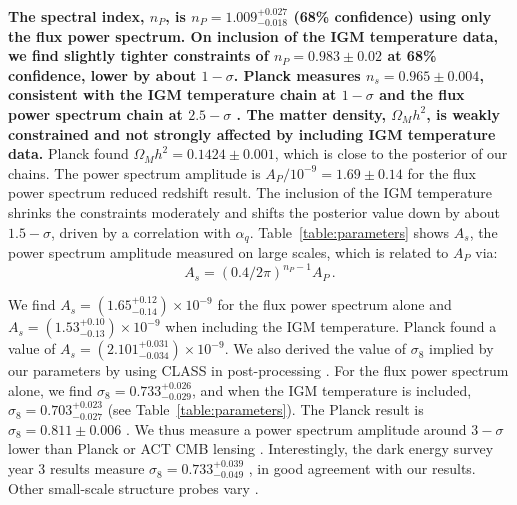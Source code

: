 \textbf{The spectral index, $n_P$, is $n_P = 1.009^{+0.027}_{-0.018}$ (68\% confidence) using only the flux power spectrum. On inclusion of the IGM temperature data, we find slightly tighter constraints of $n_P = 0.983 \pm 0.02$ at 68\% confidence, lower by about $1-\sigma$.
Planck measures $n_s=0.965 \pm 0.004$, consistent with the IGM temperature chain at $1-\sigma$ and the flux power spectrum chain at $2.5-\sigma$ \cite{2020A&A...641A...6P}.
The matter density, $\Omega_M h^2$, is weakly constrained and not strongly affected by including IGM temperature data.}
Planck found $\Omega_M h^2 = 0.1424\pm0.001$, which is close to the posterior of our chains.
The power spectrum amplitude is $A_P/10^{-9} = 1.69 \pm 0.14$ for the flux power spectrum reduced redshift result.
The inclusion of the IGM temperature shrinks the constraints moderately and shifts the posterior value down by about $1.5-\sigma$, driven by a correlation with $\alpha_q$.
Table~\ref{table:parameters} shows $A_s$, the power spectrum amplitude measured on large scales, which is related to $A_P$ via:
\begin{equation}
    A_s = \left(0.4/2\pi\right)^{n_P-1} A_P\,.
\end{equation}

We find $A_s = (1.65^{+0.12}_{-0.14}) \times10^{-9}$ for the flux power spectrum alone and $A_s = (1.53^{+0.10}_{-0.13})\times10^{-9}$ when including the IGM temperature.
Planck \cite{2020A&A...641A...6P} found a value of $A_s = \left(2.101^{+0.031}_{-0.034}\right)\times10^{-9}$. 
We also derived the value of $\sigma_8$ implied by our parameters by using CLASS in post-processing \cite{2011arXiv1104.2932L}. 
For the flux power spectrum alone, we find $\sigma_8 = 0.733^{+0.026}_{-0.029}$, and when the IGM temperature is included, $\sigma_8 = 0.703^{+0.023}_{-0.027}$ (see Table~\ref{table:parameters}).
The Planck result is $\sigma_8 = 0.811 \pm 0.006$ \cite{2020A&A...641A...6P}.
We thus measure a power spectrum amplitude around $3-\sigma$ lower than Planck or ACT CMB lensing \cite{2023arXiv230405202Q}.
Interestingly, the dark energy survey year 3 results measure $\sigma_8 = 0.733^{+0.039}_{-0.049}$ \cite{2022PhRvD.105b3520A}, in good agreement with our results. Other small-scale structure probes vary \cite[e.g.~][]{2020JCAP...05..042I, 2022JHEAp..34...49A, 2023JCAP...04..057Y}. 

